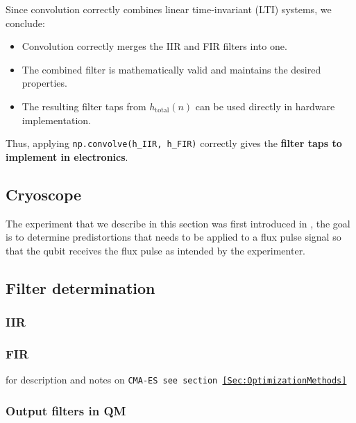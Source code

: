 Since convolution correctly combines linear time-invariant (LTI) systems, we conclude:

\begin{itemize}
    \item Convolution correctly merges the IIR and FIR filters into one.
    \item The combined filter is mathematically valid and maintains the desired properties.
    \item The resulting filter taps from \( h_{\text{total}}(n) \) can be used directly in hardware implementation.
\end{itemize}

Thus, applying \texttt{np.convolve(h\_IIR, h\_FIR)} correctly gives the \textbf{filter taps to implement in electronics}.



\subsection{Cryoscope}
The experiment that we describe in this section was first introduced in \cite{rol_time-domain_2020}, the goal is to determine predistortions that needs to be applied to a flux pulse signal so that the qubit receives the flux pulse as intended by the experimenter.

\begin{comment}
    TO DO LIST:
    * calcoli analitici per assunzioni del cryoscope
    * calcoli analitici di convoluzioni per dimostrare che è giusto il modo in cui combiniamo i filtri
    * costruire script per analisi dati
    * eventualmente provare ad aggiungere più correzioni esponenziali
\end{comment}
\subsection{Filter determination}
\subsubsection{IIR}
\subsubsection{FIR}
for description and notes on \tt{CMA-ES} see section \ref{Sec:OptimizationMethods}
\subsubsection{Output filters in QM}
